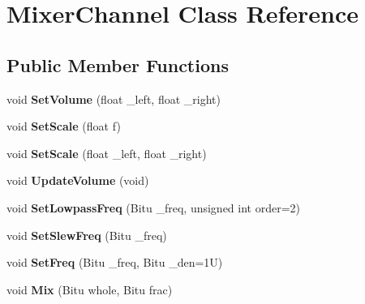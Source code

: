 \hypertarget{classMixerChannel}{\section{Mixer\-Channel Class Reference}
\label{classMixerChannel}
}
\subsection*{Public Member Functions}
\begin{DoxyCompactItemize}
\item 
\hypertarget{classMixerChannel_a547da19129e9690e9af67178189562cf}{void {\bfseries Set\-Volume} (float \-\_\-left, float \-\_\-right)}\label{classMixerChannel_a547da19129e9690e9af67178189562cf}

\item 
\hypertarget{classMixerChannel_ab36f75e5005f67da923efc8ba8b7f2e2}{void {\bfseries Set\-Scale} (float f)}\label{classMixerChannel_ab36f75e5005f67da923efc8ba8b7f2e2}

\item 
\hypertarget{classMixerChannel_ab339b50ad505d3e9ed7fd1a62ac93c33}{void {\bfseries Set\-Scale} (float \-\_\-left, float \-\_\-right)}\label{classMixerChannel_ab339b50ad505d3e9ed7fd1a62ac93c33}

\item 
\hypertarget{classMixerChannel_ac33a5acf44812b9ba4706960b2067552}{void {\bfseries Update\-Volume} (void)}\label{classMixerChannel_ac33a5acf44812b9ba4706960b2067552}

\item 
\hypertarget{classMixerChannel_a7d752500c09917c50e87f30ce76f19ba}{void {\bfseries Set\-Lowpass\-Freq} (Bitu \-\_\-freq, unsigned int order=2)}\label{classMixerChannel_a7d752500c09917c50e87f30ce76f19ba}

\item 
\hypertarget{classMixerChannel_a3de9c959c7e9d68838ef69f44602ffb8}{void {\bfseries Set\-Slew\-Freq} (Bitu \-\_\-freq)}\label{classMixerChannel_a3de9c959c7e9d68838ef69f44602ffb8}

\item 
\hypertarget{classMixerChannel_ac9960e9c8e3bde4d0c77ccce9a6de331}{void {\bfseries Set\-Freq} (Bitu \-\_\-freq, Bitu \-\_\-den=1\-U)}\label{classMixerChannel_ac9960e9c8e3bde4d0c77ccce9a6de331}

\item 
\hypertarget{classMixerChannel_aada1c5055048850708366adb5fe925aa}{void {\bfseries Mix} (Bitu whole, Bitu frac)}\label{classMixerChannel_aada1c5055048850708366adb5fe925aa}


\end{DoxyCompactItemize}
